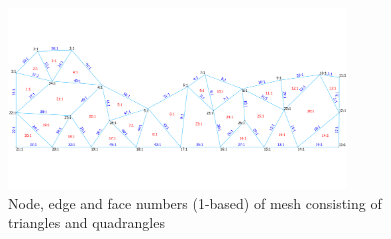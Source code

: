 \documentclass[biblatex]{deltares_memo}
\begin{document}
\begin{figure}[H]
	\centering
	\includegraphics[width=0.8\textwidth]{pictures/all_numbers_quadrangles.png}
	\caption{Node, edge and face numbers (1-based) of mesh consisting of triangles and quadrangles}
\end{figure}

\LastPage
\end{document}

